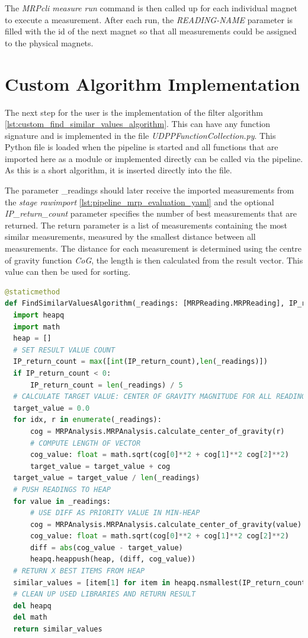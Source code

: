 The \emph{MRPcli measure run} command is then called up for each
individual magnet to execute a measurement. After each run, the
\emph{READING-NAME} parameter is filled with the id of the next magnet
so that all measurements could be assigned to the physical magnets.

\hypertarget{custom-algorithm-implementation}{%
\section{Custom Algorithm
Implementation}\label{custom-algorithm-implementation}}

The next step for the user is the implementation of the filter algorithm
\ref{lst:custom_find_similar_values_algorithm}. This can have any
function signature and is implemented in the file
\emph{UDPPFunctionCollection.py}. This Python file is loaded when the
pipeline is started and all functions that are imported here as a module
or implemented directly can be called via the pipeline. As this is a
short algorithm, it is inserted directly into the file.

The parameter \_readings should later receive the imported measurements
from the \emph{stage rawimport} \ref{lst:pipeline_mrp_evaluation_yaml}
and the optional \emph{IP\_return\_count} parameter specifies the number
of best measurements that are returned. The return parameter is a list
of measurements containing the most similar measurements, measured by
the smallest distance between all measurements. The distance for each
measurement is determined using the centre of gravity function
\emph{CoG}, the length is then calculated from the result vector. This
value can then be used for sorting.

\begin{lstlisting}[language=Python, caption={User implemented custom find most similar readings algorithm}, label=lst:custom_find_similar_values_algorithm]
@staticmethod
def FindSimilarValuesAlgorithm(_readings: [MRPReading.MRPReading], IP_return_count: int = -1) -> [MRPReading.MRPReading]:
  import heapq
  import math
  heap = []
  # SET RESULT VALUE COUNT
  IP_return_count = max([int(IP_return_count),len(_readings)])
  if IP_return_count < 0:
      IP_return_count = len(_readings) / 5
  # CALCULATE TARGET VALUE: CENTER OF GRAVITY MAGNITUDE FOR ALL READINGS
  target_value = 0.0
  for idx, r in enumerate(_readings):
      cog = MRPAnalysis.MRPAnalysis.calculate_center_of_gravity(r)
      # COMPUTE LENGTH OF VECTOR
      cog_value: float = math.sqrt(cog[0]**2 + cog[1]**2 cog[2]**2)
      target_value = target_value + cog
  target_value = target_value / len(_readings)
  # PUSH READINGS TO HEAP
  for value in _readings:
      # USE DIFF AS PRIORITY VALUE IN MIN-HEAP
      cog = MRPAnalysis.MRPAnalysis.calculate_center_of_gravity(value)
      cog_value: float = math.sqrt(cog[0]**2 + cog[1]**2 cog[2]**2)
      diff = abs(cog_value - target_value)
      heapq.heappush(heap, (diff, cog_value))
  # RETURN X BEST ITEMS FROM HEAP
  similar_values = [item[1] for item in heapq.nsmallest(IP_return_count, heap)]
  # CLEAN UP USED LIBRARIES AND RETURN RESULT
  del heapq
  del math
  return similar_values
\end{lstlisting}

